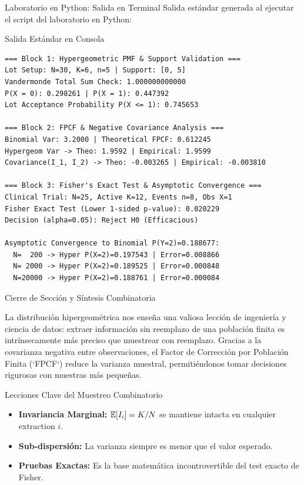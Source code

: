 \documentclass[10pt, aspectratio=169]{beamer}
\begin{document}
\begin{frame}[fragile]{Laboratorio en Python: Salida en Terminal}
  \scriptsize
  Salida estándar generada al ejecutar el script del laboratorio en Python:
  \vspace{0.05cm}
  \begin{block}{Salida Estándar en Consola}
    \fontsize{5pt}{6pt}\selectfont
    \begin{verbatim}
=== Block 1: Hypergeometric PMF & Support Validation ===
Lot Setup: N=30, K=6, n=5 | Support: [0, 5]
Vandermonde Total Sum Check: 1.000000000000
P(X = 0): 0.298261 | P(X = 1): 0.447392
Lot Acceptance Probability P(X <= 1): 0.745653

=== Block 2: FPCF & Negative Covariance Analysis ===
Binomial Var: 3.2000 | Theoretical FPCF: 0.612245
Hypergeom Var -> Theo: 1.9592 | Empirical: 1.9599
Covariance(I_1, I_2) -> Theo: -0.003265 | Empirical: -0.003810

=== Block 3: Fisher's Exact Test & Asymptotic Convergence ===
Clinical Trial: N=25, Active K=12, Events n=8, Obs X=1
Fisher Exact Test (Lower 1-sided p-value): 0.020229
Decision (alpha=0.05): Reject H0 (Efficacious)

Asymptotic Convergence to Binomial P(Y=2)=0.188677:
  N=  200 -> Hyper P(X=2)=0.197543 | Error=0.008866
  N= 2000 -> Hyper P(X=2)=0.189525 | Error=0.000848
  N=20000 -> Hyper P(X=2)=0.188761 | Error=0.000084
    \end{verbatim}
  \end{block}
\end{frame}






\begin{frame}{Cierre de Sección y Síntesis Combinatoria}
  \begin{reflexion}
    La distribución hipergeométrica nos enseña una valiosa lección de ingeniería y ciencia de datos: extraer información sin reemplazo de una población finita es intrínsecamente más preciso que muestrear con reemplazo. Gracias a la covarianza negativa entre observaciones, el Factor de Corrección por Población Finita (`FPCF`) reduce la varianza muestral, permitiéndonos tomar decisiones rigurosas con muestras más pequeñas.
  \end{reflexion}

  \vspace{0.4cm}
  \pause
  \begin{block}{Lecciones Clave del Muestreo Combinatorio}
    \begin{itemize}\itemsep=0.15cm
      \item \textbf{Invariancia Marginal:} $\mathbb{E}[I_i] = K/N$ se mantiene intacta en cualquier extraction $i$.
      \item \textbf{Sub-dispersión:} La varianza siempre es menor que el valor esperado.
      \item \textbf{Pruebas Exactas:} Es la base matemática incontrovertible del test exacto de Fisher.
    \end{itemize}
  \end{block}
\end{frame}
\end{document}
